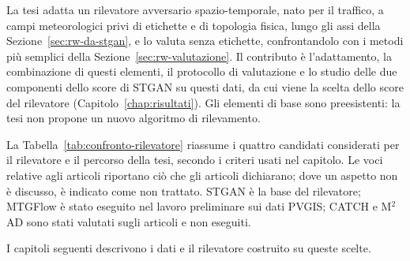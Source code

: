 La tesi adatta un rilevatore avversario spazio-temporale, nato per il traffico, a campi meteorologici privi di etichette e di topologia fisica, lungo gli assi della Sezione~\ref{sec:rw-da-stgan}, e lo valuta senza etichette, confrontandolo con i metodi più semplici della Sezione~\ref{sec:rw-valutazione}. Il contributo è l'adattamento, la combinazione di questi elementi, il protocollo di valutazione e lo studio delle due componenti dello score di STGAN su questi dati, da cui viene la scelta dello score del rilevatore (Capitolo~\ref{chap:risultati}). Gli elementi di base sono preesistenti: la tesi non propone un nuovo algoritmo di rilevamento.

La Tabella~\ref{tab:confronto-rilevatore} riassume i quattro candidati considerati per il rilevatore e il percorso della tesi, secondo i criteri usati nel capitolo. Le voci relative agli articoli riportano ciò che gli articoli dichiarano; dove un aspetto non è discusso, è indicato come non trattato. STGAN è la base del rilevatore; MTGFlow è stato eseguito nel lavoro preliminare sui dati PVGIS; CATCH e M$^2$AD sono stati valutati sugli articoli e non eseguiti.


I capitoli seguenti descrivono i dati e il rilevatore costruito su queste scelte.
